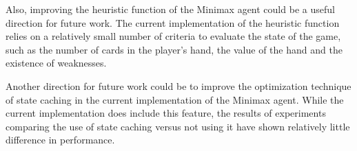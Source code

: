 Also, improving the heuristic function of the Minimax agent could be a useful direction for future work. The current implementation of the heuristic function relies on a relatively small number of criteria to evaluate the state of the game, such as the number of cards in the player's hand, the value of the hand and the existence of weaknesses.

Another direction for future work could be to improve the optimization technique of state caching in the current implementation of the Minimax agent. While the current implementation does include this feature, the results of experiments comparing the use of state caching versus not using it have shown relatively little difference in performance.